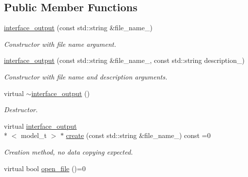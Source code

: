 \subsection*{Public Member Functions}
\begin{DoxyCompactItemize}
\item 
\hypertarget{a00315_aa5ce96d626aa9caeeba50ea9e44461cb}{\hyperlink{a00315_aa5ce96d626aa9caeeba50ea9e44461cb}{interface\-\_\-output} (const std\-::string \&file\-\_\-name\-\_\-)}\label{a00315_aa5ce96d626aa9caeeba50ea9e44461cb}

\begin{DoxyCompactList}\small\item\em Constructor with file name argument. \end{DoxyCompactList}\item 
\hypertarget{a00315_a760fd43bcc09c6ad679ad7a02dfc0b41}{\hyperlink{a00315_a760fd43bcc09c6ad679ad7a02dfc0b41}{interface\-\_\-output} (const std\-::string \&file\-\_\-name\-\_\-, const std\-::string description\-\_\-)}\label{a00315_a760fd43bcc09c6ad679ad7a02dfc0b41}

\begin{DoxyCompactList}\small\item\em Constructor with file name and description arguments. \end{DoxyCompactList}\item 
\hypertarget{a00315_a2c347bdc9f312885ec2b2a6c106d6b08}{virtual \hyperlink{a00315_a2c347bdc9f312885ec2b2a6c106d6b08}{$\sim$interface\-\_\-output} ()}\label{a00315_a2c347bdc9f312885ec2b2a6c106d6b08}

\begin{DoxyCompactList}\small\item\em Destructor. \end{DoxyCompactList}\item 
\hypertarget{a00315_a82146fc6a440711b242c5fd2f4909f2b}{virtual \hyperlink{a00315}{interface\-\_\-output}\\*
$<$ model\-\_\-t $>$ $\ast$ \hyperlink{a00315_a82146fc6a440711b242c5fd2f4909f2b}{create} (const std\-::string \&file\-\_\-name\-\_\-) const =0}\label{a00315_a82146fc6a440711b242c5fd2f4909f2b}

\begin{DoxyCompactList}\small\item\em Creation method, no data copying expected. \end{DoxyCompactList}\item 
\hypertarget{a00315_ab056e5f5f2fe27c097d06e5d25f6e22c}{virtual bool \hyperlink{a00315_ab056e5f5f2fe27c097d06e5d25f6e22c}{open\-\_\-file} ()=0}\label{a00315_ab056e5f5f2fe27c097d06e5d25f6e22c}


\end{DoxyCompactItemize}

